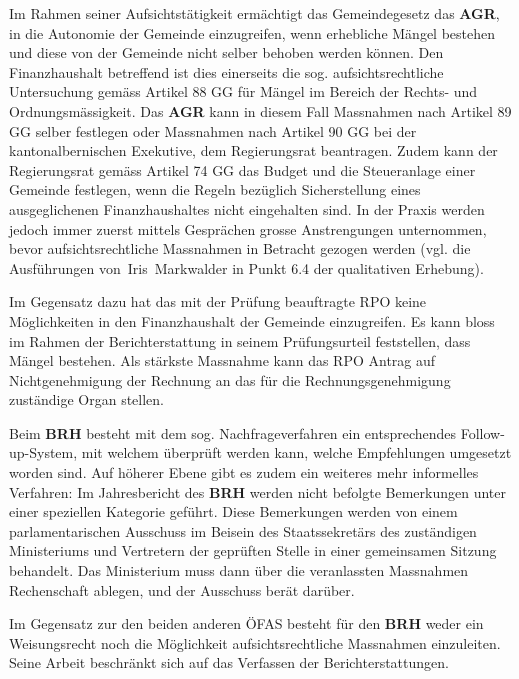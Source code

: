 \documentclass[10pt]{article}
\begin{document}
Im Rahmen seiner Aufsichtstätigkeit ermächtigt das Gemeindegesetz das \textbf{AGR}, in die Autonomie der Gemeinde einzugreifen, wenn erhebliche Mängel bestehen und diese von der Gemeinde nicht selber behoben werden können. Den Finanzhaushalt betreffend ist dies einerseits die sog. aufsichtsrechtliche Untersuchung gemäss Artikel 88 GG für Mängel im Bereich der Rechts- und Ordnungsmässigkeit. Das \textbf{AGR} kann in diesem Fall Massnahmen nach Artikel 89 GG selber festlegen oder Massnahmen nach Artikel 90 GG bei der kantonalbernischen Exekutive, dem Regierungsrat beantragen. Zudem kann der Regierungsrat gemäss Artikel 74 GG das Budget und die Steueranlage einer Gemeinde festlegen, wenn die Regeln bezüglich Sicherstellung eines ausgeglichenen Finanzhaushaltes nicht eingehalten sind. In der Praxis werden jedoch immer zuerst mittels Gesprächen grosse Anstrengungen unternommen, bevor aufsichtsrechtliche Massnahmen in Betracht gezogen werden (vgl. die Ausführungen von~Iris~Markwalder in Punkt 6.4 der qualitativen Erhebung).

Im Gegensatz dazu hat das mit der Prüfung beauftragte RPO keine Möglichkeiten in den Finanzhaushalt der Gemeinde einzugreifen. Es kann bloss im Rahmen der Berichterstattung in seinem Prüfungsurteil feststellen, dass Mängel bestehen. Als stärkste Massnahme kann das RPO Antrag auf Nichtgenehmigung der Rechnung an das für die Rechnungsgenehmigung zuständige Organ stellen. 

Beim \textbf{BRH} besteht mit dem sog. Nachfrageverfahren ein entsprechendes Follow-up-System, mit welchem überprüft werden kann, welche Empfehlungen umgesetzt worden sind. Auf höherer Ebene gibt es zudem ein weiteres mehr informelles Verfahren: Im Jahresbericht des \textbf{BRH} werden nicht befolgte Bemerkungen unter einer speziellen Kategorie geführt. Diese Bemerkungen werden von einem parlamentarischen Ausschuss im Beisein des Staatssekretärs des zuständigen Ministeriums und Vertretern der geprüften Stelle in einer gemeinsamen Sitzung behandelt. Das Ministerium muss dann über die veranlassten Massnahmen Rechenschaft ablegen, und der Ausschuss berät darüber.

Im Gegensatz zur den beiden anderen ÖFAS besteht für den \textbf{BRH }weder ein Weisungsrecht noch die Möglichkeit aufsichtsrechtliche Massnahmen einzuleiten. Seine Arbeit beschränkt sich auf das Verfassen der Berichterstattungen.
\end{document}
